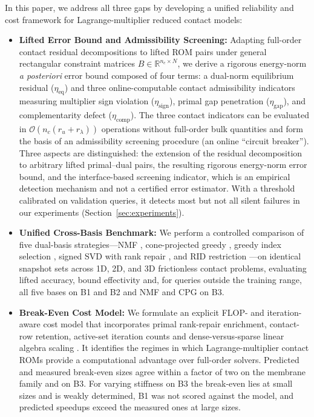 \documentclass[11pt,a4paper]{article}
\begin{document}
In this paper, we address all three gaps by developing a unified reliability and cost framework for Lagrange-multiplier reduced contact models:
\begin{itemize}
    \item \textbf{Lifted Error Bound and Admissibility Screening:} Adapting full-order contact residual decompositions \cite{hild2007residual, banz2024generic, banz2026posteriori} to lifted ROM pairs under general rectangular constraint matrices $B \in \mathbb{R}^{n_c \times N}$, we derive a rigorous energy-norm \emph{a posteriori} error bound composed of four terms: a dual-norm equilibrium residual ($\eta_{\mathrm{eq}}$) and three online-computable contact admissibility indicators measuring multiplier sign violation ($\eta_{\mathrm{sign}}$), primal gap penetration ($\eta_{\mathrm{gap}}$), and complementarity defect ($\eta_{\mathrm{comp}}$). The three contact indicators can be evaluated in $\mathcal{O}(n_c (r_u + r_\lambda))$ operations without full-order bulk quantities and form the basis of an admissibility screening procedure (an online ``circuit breaker''). Three aspects are distinguished: the extension of the residual decomposition to arbitrary lifted primal--dual pairs, the resulting rigorous energy-norm error bound, and the interface-based screening indicator, which is an empirical detection mechanism and not a certified error estimator. With a threshold calibrated on validation queries, it detects most but not all silent failures in our experiments (Section~\ref{sec:experiments}).
    \item \textbf{Unified Cross-Basis Benchmark:} We perform a controlled comparison of five dual-basis strategies---NMF \cite{balajewicz2016projection}, cone-projected greedy \cite{benaceur2020reduced}, greedy index selection \cite{sambataro2026model}, signed SVD with rank repair \cite{leberre2022condition}, and RID restriction \cite{fauque2018hybrid, leberre2022condition}---on identical snapshot sets across 1D, 2D, and 3D frictionless contact problems, evaluating lifted accuracy, bound effectivity and, for queries outside the training range, all five bases on B1 and B2 and NMF and CPG on B3.
    \item \textbf{Break-Even Cost Model:} We formulate an explicit FLOP- and iteration-aware cost model that incorporates primal rank-repair enrichment, contact-row retention, active-set iteration counts and dense-versus-sparse linear algebra scaling \cite{franceschini2022block}. It identifies the regimes in which Lagrange-multiplier contact ROMs provide a computational advantage over full-order solvers. Predicted and measured break-even sizes agree within a factor of two on the membrane family and on B3. For varying stiffness on B3 the break-even lies at small sizes and is weakly determined, B1 was not scored against the model, and predicted speedups exceed the measured ones at large sizes.
\end{itemize}
\end{document}
